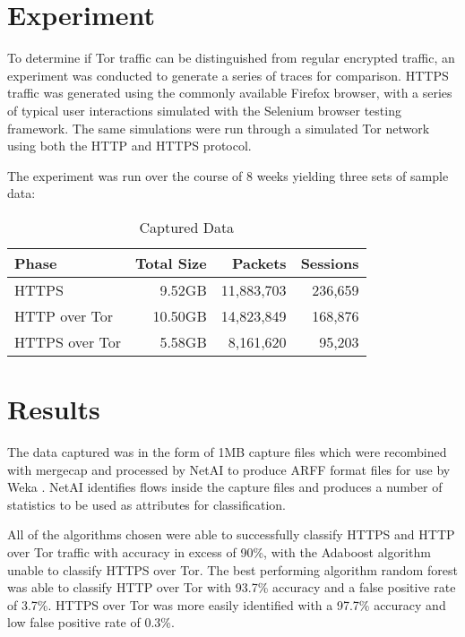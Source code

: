 \documentclass[conference]{IEEEtran}
\begin{document}
\section{Experiment}

To determine if Tor traffic can be distinguished from regular encrypted
traffic, an experiment was conducted to generate a series of traces for
comparison. HTTPS traffic was generated using the commonly available Firefox
browser, with a series of typical user interactions simulated with the Selenium
browser testing framework. The same simulations were run through a simulated
Tor network using both the HTTP and HTTPS protocol.

The experiment was run over the course of 8 weeks yielding three sets of sample
data:

\begin{table}[H]
  \begin{tabular*}{\linewidth}{lrrr}
    \toprule
    Phase & Total Size & Packets & Sessions\\
    \midrule
    HTTPS & 9.52GB & 11,883,703 & 236,659\\
    HTTP over Tor & 10.50GB & 14,823,849 & 168,876\\
    HTTPS over Tor & 5.58GB & 8,161,620 & 95,203\\
    \bottomrule
  \end{tabular*}
  \caption{Captured Data} \label{table:datasets}
\end{table}


\section{Results}

The data captured was in the form of 1MB capture files which were recombined
with mergecap and processed by NetAI \parencite{swinbut:2006fk} to produce ARFF
format files for use by Weka \parencite{Hall:2009p7662,Bouckaert:2010we}. NetAI
identifies flows inside the capture files and produces a number of statistics
to be used as attributes for classification. 

All of the algorithms chosen were able to successfully classify HTTPS and HTTP
over Tor traffic with accuracy in excess of 90\%, with the Adaboost algorithm
unable to classify HTTPS over Tor. The best performing algorithm random forest
was able to classify HTTP over Tor with 93.7\% accuracy and a false positive
rate of 3.7\%. HTTPS over Tor was more easily identified with a 97.7\% accuracy
and low false positive rate of 0.3\%.
\end{document}
